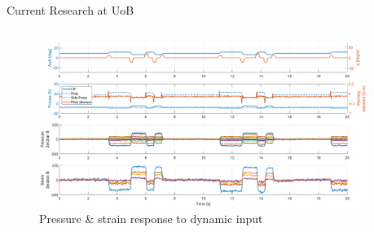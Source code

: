 \documentclass[aspectratio=169]{beamer}            %
\begin{document}
\begin{frame}{Current Research at UoB}

	\begin{columns}
    \begin{column}{0.6\textwidth}
		  \begin{figure}[!htb]
        \centering
			 \includegraphics[height=0.45\textwidth]{DistSens_DynResponse.eps}
			 \caption{Pressure \& strain response to dynamic input}
			 \label{fig:DistSens_DynResponse}
      \end{figure}
		\end{column}
    \begin{column}{0.4\textwidth}
      
		\end{column}
	\end{columns}

\end{frame}
\end{document}
